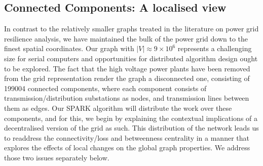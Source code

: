 \subsection{Connected Components: A localised view}
In contrast to the relatively smaller graphs treated in the literature on power grid resilience analysis, we have maintained the bulk of the power grid down to the finest spatial coordinates. Our graph with $\left \vert V \right \vert \approx 9 \times 10^6 $ represents a challenging size for serial computers and opportunities for distributed algorithm design ought to be explored. The fact that the high voltage power plants have been removed from the grid representation render the graph a disconnected one, consisting of 199004 connected components, where each component consists of transmission/distribution substations as nodes, and transmission lines between them as edges. Our SPARK algorithm will distribute the work over these components, and for this, we begin by explaining the contextual implications of a decentralised version of the grid as such. This distribution of the network leads us to readdress the connectivity/loss and betweenness centrality in a manner that explores the effects of local changes on the global graph properties. We address those two issues separately below.

